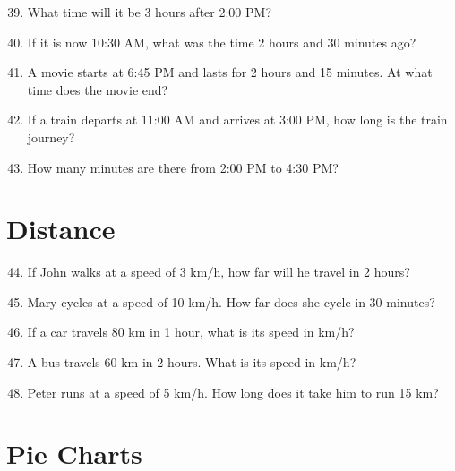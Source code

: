 \documentclass[10pt,a4paper]{article}
\begin{document}
\begin{enumerate}
\setcounter{enumi}{38}
\item What time will it be 3 hours after 2:00 PM?
\item If it is now 10:30 AM, what was the time 2 hours and 30 minutes ago?
\item A movie starts at 6:45 PM and lasts for 2 hours and 15 minutes. At what time does the movie end?
\item If a train departs at 11:00 AM and arrives at 3:00 PM, how long is the train journey?
\item How many minutes are there from 2:00 PM to 4:30 PM?
\end{enumerate}

\section*{Distance}

\begin{enumerate}
\setcounter{enumi}{43}
\item If John walks at a speed of 3 km/h, how far will he travel in 2 hours?
\item Mary cycles at a speed of 10 km/h. How far does she cycle in 30 minutes?
\item If a car travels 80 km in 1 hour, what is its speed in km/h?
\item A bus travels 60 km in 2 hours. What is its speed in km/h?
\item Peter runs at a speed of 5 km/h. How long does it take him to run 15 km?
\end{enumerate}

\section*{Pie Charts}
\end{document}
